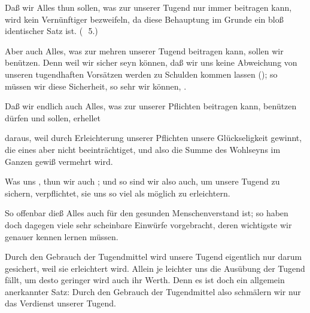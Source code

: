 \begin{aufza}
\item Daß wir Alles thun sollen, was zur  unserer Tugend nur immer beitragen kann, wird kein Vernünftiger bezweifeln, da diese Behauptung im Grunde ein bloß identischer Satz ist. (\ \no\,5.)
\item Aber auch Alles, was zur mehren  unserer Tugend beitragen kann, sollen wir benützen. Denn weil wir  sicher seyn können, daß wir uns keine Abweichung von unseren tugendhaften Vorsätzen werden zu Schulden kommen lassen (); so müssen wir diese Sicherheit, so sehr wir können, .
\item Daß wir endlich auch Alles, was zur  unserer Pflichten beitragen kann, benützen dürfen und sollen, erhellet~
\begin{aufzb}
\item daraus, weil durch Erleichterung unserer Pflichten unsere  Glückseligkeit gewinnt, die eines  aber nicht beeinträchtiget, und also die Summe des Wohlseyns im Ganzen gewiß vermehrt wird.
\item Was uns , thun wir auch ; und so sind wir also auch, um unsere Tugend zu sichern, verpflichtet, sie uns so viel als möglich zu erleichtern.
\end{aufzb}
\item So offenbar dieß Alles auch für den gesunden Menschenverstand ist; so haben doch  dagegen viele sehr scheinbare Einwürfe vorgebracht, deren wichtigste wir genauer kennen lernen müssen.
\end{aufza}\par
{} Durch den Gebrauch der Tugendmittel wird unsere Tugend eigentlich nur darum gesichert, weil sie erleichtert wird. Allein je leichter uns die Ausübung der Tugend fällt, um desto geringer wird auch ihr Werth. Denn es ist doch ein allgemein anerkannter Satz:  Durch den Gebrauch der Tugendmittel also schmälern wir nur das Verdienst unserer Tugend.\par
